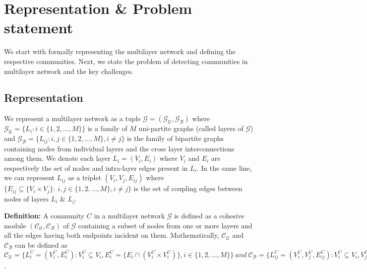 \section{Representation \& Problem statement}
\label{dataset}
We start with formally representing the multilayer network and defining the respective communities. Next, we state the problem of 
detecting communities in multilayer network and the key challenges.
\subsection{Representation}
We represent a multilayer network as a
tuple $\mathcal{G} = (\mathcal{G_U},\mathcal{G_B})$ where $\mathcal{G_U} = \{L_i: i \in \{1, 2, \dots, M\} \}$ is a
family of $M$ uni-partite graphs (called layers of $\mathcal{G}$)
and $\mathcal{G_B} = \{L_{ij}: i,j \in \{1, 2, \dots, M\}, i \neq j \}$ is the family of bipartite graphs containing nodes from
individual layers and the cross layer interconnections among them.
We denote each layer $L_i=(V_i, E_i)$ where $V_i$ and $E_i$ are respectively the
set of nodes and intra-layer edges present in $L_i$. In the same line, we can represent $L_{ij}$ as a triplet $(V_i, V_j, E_{ij})$
where $\{E_{ij} \subseteq \{V_i \times V_j\}:~i, j \in \{1, 2, \dots, M \}, i \neq j\}$ is the set of coupling edges
between nodes of layers $L_i$ \& $L_j$.



\textbf{Definition:} A community $C$ in a multilayer network $\mathcal{G}$ is defined as a cohesive 
module $(\mathcal{C_U},\mathcal{C_B})$ of $\mathcal{G}$
containing a subset of nodes from one or more layers and all the edges having both endpoints incident on them.
Mathematically, $\mathcal{C_U}$ and $\mathcal{C_B}$ can be
defined as
$
\mathcal{C_U} = \{L^C_i = (V^C_i, E^C_i): V^C_i \subseteq V_i, E^C_i = \{E_i \cap (V^C_i \times V^C_i)\}, i \in \{1, 2, \dots, M\} \} ~and~
\mathcal{C_B} = \{L^C_{ij} = (V^C_i, V^C_j, E^C_{ij}): V^C_i \subseteq V_i, V^C_j \subseteq V_j, E^C_{ij} = \{E_{ij} \cap (V^C_i \times V^C_j)\}, i,j \in \{1, 2, \dots, M\}, i \neq j\}
$.

